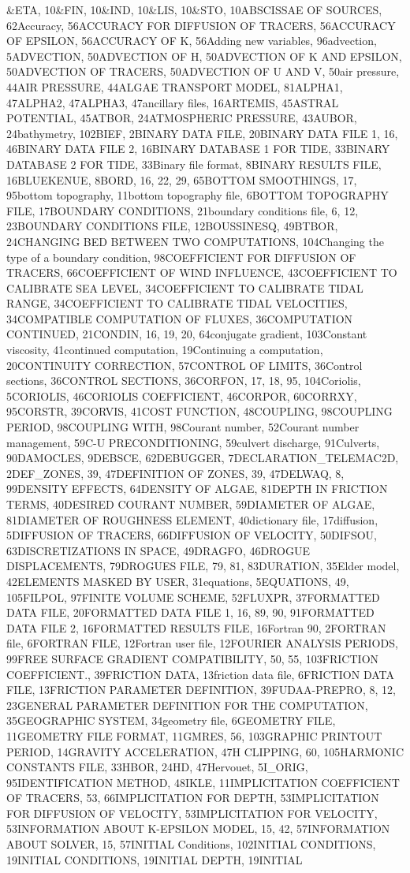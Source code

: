 \documentclass{article} %
\begin{document}
 \&ETA, 10\&FIN, 10\&IND, 10\&LIS, 10\&STO, 10ABSCISSAE OF SOURCES, 62Accuracy, 56ACCURACY FOR DIFFUSION OF TRACERS, 56ACCURACY OF EPSILON, 56ACCURACY OF K, 56Adding new variables, 96advection, 5ADVECTION, 50ADVECTION OF H, 50ADVECTION OF K AND EPSILON, 50ADVECTION OF TRACERS, 50ADVECTION OF U AND V, 50air pressure, 44AIR PRESSURE, 44ALGAE TRANSPORT MODEL, 81ALPHA1, 47ALPHA2, 47ALPHA3, 47ancillary files, 16ARTEMIS, 45ASTRAL POTENTIAL, 45ATBOR, 24ATMOSPHERIC PRESSURE, 43AUBOR, 24bathymetry, 102BIEF, 2BINARY DATA FILE, 20BINARY DATA FILE 1, 16, 46BINARY DATA FILE 2, 16BINARY DATABASE 1 FOR TIDE, 33BINARY DATABASE 2 FOR TIDE, 33Binary file format, 8BINARY RESULTS FILE, 16BLUEKENUE, 8BORD, 16, 22, 29, 65BOTTOM SMOOTHINGS, 17, 95bottom topography, 11bottom topography file, 6BOTTOM TOPOGRAPHY FILE, 17BOUNDARY CONDITIONS, 21boundary conditions file, 6, 12, 23BOUNDARY CONDITIONS FILE, 12BOUSSINESQ, 49BTBOR, 24CHANGING BED BETWEEN TWO COMPUTATIONS, 104Changing the type of a boundary condition, 98COEFFICIENT FOR DIFFUSION OF TRACERS, 66COEFFICIENT OF WIND INFLUENCE, 43COEFFICIENT TO CALIBRATE SEA LEVEL, 34COEFFICIENT TO CALIBRATE TIDAL RANGE, 34COEFFICIENT TO CALIBRATE TIDAL VELOCITIES, 34COMPATIBLE COMPUTATION OF FLUXES, 36COMPUTATION CONTINUED, 21CONDIN, 16, 19, 20, 64conjugate gradient, 103Constant viscosity, 41continued computation, 19Continuing a computation, 20CONTINUITY CORRECTION, 57CONTROL OF LIMITS, 36Control sections, 36CONTROL SECTIONS, 36CORFON, 17, 18, 95, 104Coriolis, 5CORIOLIS, 46CORIOLIS COEFFICIENT, 46CORPOR, 60CORRXY, 95CORSTR, 39CORVIS, 41COST FUNCTION, 48COUPLING, 98COUPLING PERIOD, 98COUPLING WITH, 98Courant number, 52Courant number management, 59C-U PRECONDITIONING, 59culvert discharge, 91Culverts, 90DAMOCLES, 9DEBSCE, 62DEBUGGER, 7DECLARATION\_TELEMAC2D, 2DEF\_ZONES, 39, 47DEFINITION OF ZONES, 39, 47DELWAQ, 8, 99DENSITY EFFECTS, 64DENSITY OF ALGAE, 81DEPTH IN FRICTION TERMS, 40DESIRED COURANT NUMBER, 59DIAMETER OF ALGAE, 81DIAMETER OF ROUGHNESS ELEMENT, 40dictionary file, 17diffusion, 5DIFFUSION OF TRACERS, 66DIFFUSION OF VELOCITY, 50DIFSOU, 63DISCRETIZATIONS IN SPACE, 49DRAGFO, 46DROGUE DISPLACEMENTS, 79DROGUES FILE, 79, 81, 83DURATION, 35Elder model, 42ELEMENTS MASKED BY USER, 31equations, 5EQUATIONS, 49, 105FILPOL, 97FINITE VOLUME SCHEME, 52FLUXPR, 37FORMATTED DATA FILE, 20FORMATTED DATA FILE 1, 16, 89, 90, 91FORMATTED DATA FILE 2, 16FORMATTED RESULTS FILE, 16Fortran 90, 2FORTRAN file, 6FORTRAN FILE, 12Fortran user file, 12FOURIER ANALYSIS  PERIODS, 99FREE SURFACE GRADIENT COMPATIBILITY, 50, 55, 103FRICTION COEFFICIENT., 39FRICTION DATA, 13friction data file, 6FRICTION DATA FILE, 13FRICTION PARAMETER DEFINITION, 39FUDAA-PREPRO, 8, 12, 23GENERAL PARAMETER DEFINITION FOR THE COMPUTATION, 35GEOGRAPHIC SYSTEM, 34geometry file, 6GEOMETRY FILE, 11GEOMETRY FILE FORMAT, 11GMRES, 56, 103GRAPHIC PRINTOUT PERIOD, 14GRAVITY ACCELERATION, 47H CLIPPING, 60, 105HARMONIC CONSTANTS FILE, 33HBOR, 24HD, 47Hervouet, 5I\_ORIG, 95IDENTIFICATION  METHOD, 48IKLE, 11IMPLICITATION COEFFICIENT OF TRACERS, 53, 66IMPLICITATION FOR DEPTH, 53IMPLICITATION FOR DIFFUSION OF VELOCITY, 53IMPLICITATION FOR VELOCITY, 53INFORMATION ABOUT K-EPSILON MODEL, 15, 42, 57INFORMATION ABOUT SOLVER, 15, 57INITIAL Conditions, 102INITIAL CONDITIONS, 19INITIAL CONDITIONS, 19INITIAL DEPTH, 19INITIAL 
\end{document}
